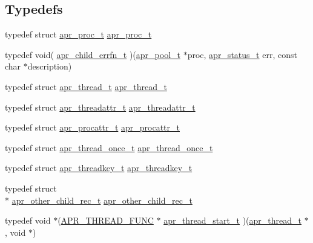 \subsection*{Typedefs}
\begin{DoxyCompactItemize}
\item 
typedef struct \hyperlink{structapr__proc__t}{apr\-\_\-proc\-\_\-t} \hyperlink{group__apr__thread__proc_gada60ec0f833048291d98e66f21f4c4c4}{apr\-\_\-proc\-\_\-t}
\item 
typedef void( \hyperlink{group__apr__thread__proc_ga8f8642f468f05b0ac2b1426b723af100}{apr\-\_\-child\-\_\-errfn\-\_\-t} )(\hyperlink{group__apr__pools_gaf137f28edcf9a086cd6bc36c20d7cdfb}{apr\-\_\-pool\-\_\-t} $\ast$proc, \hyperlink{group__apr__errno_gaf76ee4543247e9fb3f3546203e590a6c}{apr\-\_\-status\-\_\-t} err, const char $\ast$description)
\item 
typedef struct \hyperlink{group__apr__thread__proc_ga646c71351e723d84f8cc8c8d1d5937be}{apr\-\_\-thread\-\_\-t} \hyperlink{group__apr__thread__proc_ga646c71351e723d84f8cc8c8d1d5937be}{apr\-\_\-thread\-\_\-t}
\item 
typedef struct \hyperlink{group__apr__thread__proc_ga35de571e9944871c10b38d8feef885ac}{apr\-\_\-threadattr\-\_\-t} \hyperlink{group__apr__thread__proc_ga35de571e9944871c10b38d8feef885ac}{apr\-\_\-threadattr\-\_\-t}
\item 
typedef struct \hyperlink{group__apr__thread__proc_ga0d83919a6a0dd609598a864917f8b339}{apr\-\_\-procattr\-\_\-t} \hyperlink{group__apr__thread__proc_ga0d83919a6a0dd609598a864917f8b339}{apr\-\_\-procattr\-\_\-t}
\item 
typedef struct \hyperlink{group__apr__thread__proc_ga91841bcf20d0579e8e6acc6d3c220ac1}{apr\-\_\-thread\-\_\-once\-\_\-t} \hyperlink{group__apr__thread__proc_ga91841bcf20d0579e8e6acc6d3c220ac1}{apr\-\_\-thread\-\_\-once\-\_\-t}
\item 
typedef struct \hyperlink{group__apr__thread__proc_ga337c9c1bd2d47740022071a5c41f2edb}{apr\-\_\-threadkey\-\_\-t} \hyperlink{group__apr__thread__proc_ga337c9c1bd2d47740022071a5c41f2edb}{apr\-\_\-threadkey\-\_\-t}
\item 
typedef struct \\*
\hyperlink{group__apr__thread__proc_gafc52ee8b19a7b222278d31ebb3f11a71}{apr\-\_\-other\-\_\-child\-\_\-rec\-\_\-t} \hyperlink{group__apr__thread__proc_gafc52ee8b19a7b222278d31ebb3f11a71}{apr\-\_\-other\-\_\-child\-\_\-rec\-\_\-t}
\item 
typedef void $\ast$(\hyperlink{group__apr__platform_gade8f829f9bd98fd4386894acf72edd7c}{A\-P\-R\-\_\-\-T\-H\-R\-E\-A\-D\-\_\-\-F\-U\-N\-C} $\ast$ \hyperlink{group__apr__thread__proc_ga37193850d158ca870fc8f8759f0725a9}{apr\-\_\-thread\-\_\-start\-\_\-t} )(\hyperlink{group__apr__thread__proc_ga646c71351e723d84f8cc8c8d1d5937be}{apr\-\_\-thread\-\_\-t} $\ast$, void $\ast$)
\end{DoxyCompactItemize}
